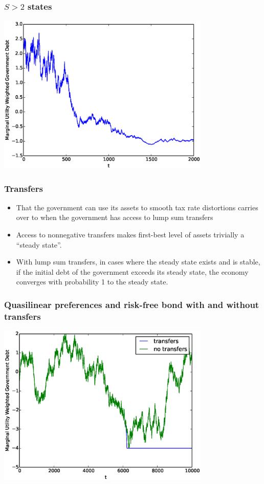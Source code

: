 \documentclass{beamer}
\begin{document}
\subsection{}

\begin{frame}
	\frametitle{$S>2$ states}
	\begin{center}
	\includegraphics[width=4in]{Images/5stateiid.eps}
	\end{center}
\end{frame}



 \begin{frame}
  \frametitle{Transfers}
	\begin{itemize}
	\item  That the government can use its assets to smooth tax rate distortions carries over to when the government has access to lump sum transfers
	\item Access to nonnegative transfers makes first-best level of assets trivially a ``steady state''.    	
\item  With lump sum transfers,  in cases where the steady state exists and is stable, if the initial debt of the government exceeds its steady state,  the economy  converges with probability 1 to the steady state.
		
	\end{itemize}
 \end{frame}

 \begin{frame}
	\frametitle{Quasilinear preferences and risk-free bond  with and without transfers}
	\begin{center}
	\includegraphics[width=4in]{Images/transfer_example2.eps}
	\end{center}
\end{frame}
\end{document}
